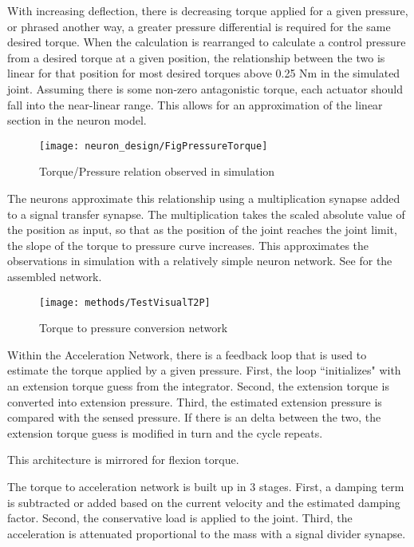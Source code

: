 With increasing deflection, there is decreasing torque applied for a given
pressure, or phrased another way, a greater pressure differential is required
for the same desired torque. When the calculation is rearranged to calculate
a control pressure from a desired torque at a given position, the relationship
between the two is linear for that position for most desired torques above
0.25 Nm in the simulated joint. Assuming there is some non-zero antagonistic
torque, each actuator should fall into the near-linear range. This allows for
an approximation of the linear section in the neuron model.

\begin{figure}
\centering
\texttt{[image: neuron\_design/FigPressureTorque]}
\caption{Torque/Pressure relation observed in simulation}
\label{fig:PressureTorque}
\end{figure}

The neurons approximate this relationship using a multiplication synapse added
to a signal transfer synapse. The multiplication takes the scaled absolute 
value of the position as input, so that as the position of the joint reaches
the joint limit, the slope of the torque to pressure curve increases. This
approximates the observations in simulation with a relatively simple neuron
network. See  for the assembled network.

\begin{figure}
\centering
\texttt{[image: methods/TestVisualT2P]}
\caption{Torque to pressure conversion network}
\label{fig:T2PNetwork}
\end{figure}


Within the Acceleration Network, there is a feedback loop that is used to 
estimate the torque applied by a given pressure. First, the loop ``initializes"
with an extension torque guess from the integrator. Second, the extension
torque is converted into extension pressure. Third, the estimated extension
pressure is compared with the sensed pressure. If there is an delta between the
two, the extension torque guess is modified in turn and the cycle repeats.

This architecture is mirrored for flexion torque.


The torque to acceleration network is built up in 3 stages. First, a damping 
term is subtracted or added based on the current velocity and the estimated
damping factor. Second, the conservative load is applied to the joint. Third,
the acceleration is attenuated proportional to the mass with a signal divider
synapse.

